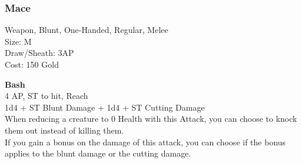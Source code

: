 \subsubsection{Mace}\label{weapon:mace}
Weapon, Blunt, One-Handed, Regular, Melee\\
Size: M\\
Draw/Sheath: 3AP\\
Cost: 150 Gold

\textbf{Bash}\\
4 AP, ST to hit,  Reach\\
1d4 + \texttimes ST Blunt Damage + 1d4 + \texttimes ST Cutting Damage\\
When reducing a creature to 0 Health with this Attack, you can choose to knock them out instead of killing them.\\
If you gain a bonus on the damage of this attack, you can choose if the bonus applies to the blunt damage or the cutting damage.